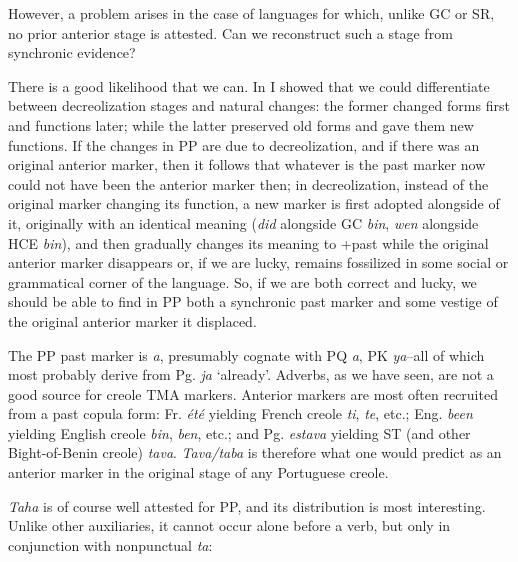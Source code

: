 However, a problem arises in the case of languages for which, unlike GC or SR, no prior anterior stage is attested. Can we reconstruct such a stage from synchronic evidence?

There is a good likelihood that we can. In \citet{Bickerton1980} I showed that we could differentiate between decreolization stages and natural changes: the former changed forms first and functions later; while the latter preserved old forms and gave them new functions. If the changes in PP are due to decreolization, and if there was an original anterior marker, then it follows that whatever is the past
marker now could not have been the anterior marker then; in decreoli\-zation, instead of the original marker changing its function, a new marker is first adopted alongside of it, originally with an identical meaning (\textit{did} alongside GC \textit{bin}, \textit{wen} alongside HCE \textit{bin}), and then gradually changes its meaning to +past while the original anterior marker disappears or, if we are lucky, remains fossilized in some social or grammatical corner of the language. So, if we are both correct and lucky, we should be able to find in PP both a synchronic past marker and some vestige of the original anterior marker it displaced.

The PP past marker is \textit{a}, presumably cognate with PQ \textit{a}, PK \textit{ya}--all of which most probably derive from Pg. \textit{ja} `already'. Adverbs, as we have seen, are not a good source for creole TMA markers. Anterior markers are most often recruited from a past copula form: Fr. \textit{été} yielding French creole \textit{ti}, \textit{te}, etc.; Eng. \textit{been} yielding English creole \textit{bin}, \textit{ben}, etc.; and Pg. \textit{estava} yielding ST (and other Bight-of-Benin creole) \textit{tava}. \textit{Tava/taba} is therefore what one would predict as an anterior marker in the original stage of any Portuguese creole.

\textit{Taha} is of course well attested for PP, and its distribution is most interesting. Unlike other auxiliaries, it cannot occur alone before a verb, but only in conjunction with nonpunctual \textit{ta}:

\label{ex:2:95}\z

\label{ex:2:96}\z



\label{ex:2:97}\z


